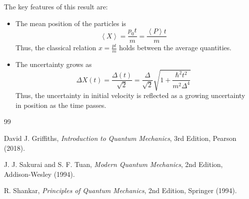\documentclass[12pt,a4paper]{report}
\newcommand{\expected}[1]{\left \langle #1 \right \rangle}
\begin{document}
The key features of this result are:
\begin{itemize}
    \item The mean position of the particles is
    \begin{equation*}
        \expected{X} = \frac{p_0t}{m} = \frac{\expected{P}t}{m}
    \end{equation*}
    Thus, the classical relation $x=\frac{pt}{m}$ holds between the average quantities.
    \item The uncertainty grows as
    \begin{equation*}
        \Delta X(t) = \frac{\Delta(t)}{\sqrt{2}} = \frac{\Delta}{\sqrt{2}} \sqrt{1 + \frac{\hbar^2t^2}{m^2\Delta^4}}
    \end{equation*}
    Thus, the uncertainty in initial velocity is reflected as a growing uncertainty in position as the time passes.
\end{itemize}

\begin{thebibliography}{99}

David J. Griffiths,
\textit{Introduction to Quantum Mechanics},
3rd Edition, Pearson (2018).

J. J. Sakurai and S. F. Tuan,
\textit{Modern Quantum Mechanics},
2nd Edition, Addison-Wesley (1994).

R. Shankar,
\textit{Principles of Quantum Mechanics},
2nd Edition, Springer (1994).

\end{thebibliography}
\end{document}
